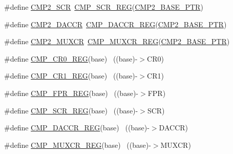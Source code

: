 \begin{DoxyCompactItemize}
\item 
\#define \hyperlink{group___c_m_p___register___accessor___macros_ga3fecb254542d1ea6f149b0b42c31fc53}{C\+M\+P2\+\_\+\+S\+CR}~\hyperlink{group___c_m_p___register___accessor___macros_ga078b884bead12ed9b24c285c8f73fd27}{C\+M\+P\+\_\+\+S\+C\+R\+\_\+\+R\+EG}(\hyperlink{group___c_m_p___peripheral_ga732cbf43f95d2d1cd01b4204263940ab}{C\+M\+P2\+\_\+\+B\+A\+S\+E\+\_\+\+P\+TR})
\item 
\#define \hyperlink{group___c_m_p___register___accessor___macros_gac57bbed7635a10b34a5db2372b7a21ea}{C\+M\+P2\+\_\+\+D\+A\+C\+CR}~\hyperlink{group___c_m_p___register___accessor___macros_ga241a18e5c046627c53ba30229a1a313c}{C\+M\+P\+\_\+\+D\+A\+C\+C\+R\+\_\+\+R\+EG}(\hyperlink{group___c_m_p___peripheral_ga732cbf43f95d2d1cd01b4204263940ab}{C\+M\+P2\+\_\+\+B\+A\+S\+E\+\_\+\+P\+TR})
\item 
\#define \hyperlink{group___c_m_p___register___accessor___macros_gaefb6742f070600e76e40da89916a80e3}{C\+M\+P2\+\_\+\+M\+U\+X\+CR}~\hyperlink{group___c_m_p___register___accessor___macros_ga61de65bd4b7dc63f96d8c361be243a08}{C\+M\+P\+\_\+\+M\+U\+X\+C\+R\+\_\+\+R\+EG}(\hyperlink{group___c_m_p___peripheral_ga732cbf43f95d2d1cd01b4204263940ab}{C\+M\+P2\+\_\+\+B\+A\+S\+E\+\_\+\+P\+TR})
\item 
\#define \hyperlink{group___c_m_p___register___accessor___macros_gade821ad13c2c460c33f1c0929cc904c3}{C\+M\+P\+\_\+\+C\+R0\+\_\+\+R\+EG}(base)                                            ~((base)-\/$>$C\+R0)
\item 
\#define \hyperlink{group___c_m_p___register___accessor___macros_ga2f761d7412507e4415f230a5e4d972a2}{C\+M\+P\+\_\+\+C\+R1\+\_\+\+R\+EG}(base)                                            ~((base)-\/$>$C\+R1)
\item 
\#define \hyperlink{group___c_m_p___register___accessor___macros_ga343773a1ef97ce5124a805a7e42af104}{C\+M\+P\+\_\+\+F\+P\+R\+\_\+\+R\+EG}(base)                                            ~((base)-\/$>$F\+PR)
\item 
\#define \hyperlink{group___c_m_p___register___accessor___macros_ga078b884bead12ed9b24c285c8f73fd27}{C\+M\+P\+\_\+\+S\+C\+R\+\_\+\+R\+EG}(base)                                            ~((base)-\/$>$S\+CR)
\item 
\#define \hyperlink{group___c_m_p___register___accessor___macros_ga241a18e5c046627c53ba30229a1a313c}{C\+M\+P\+\_\+\+D\+A\+C\+C\+R\+\_\+\+R\+EG}(base)                                        ~((base)-\/$>$D\+A\+C\+CR)
\item 
\#define \hyperlink{group___c_m_p___register___accessor___macros_ga61de65bd4b7dc63f96d8c361be243a08}{C\+M\+P\+\_\+\+M\+U\+X\+C\+R\+\_\+\+R\+EG}(base)                                        ~((base)-\/$>$M\+U\+X\+CR)

\end{DoxyCompactItemize}
